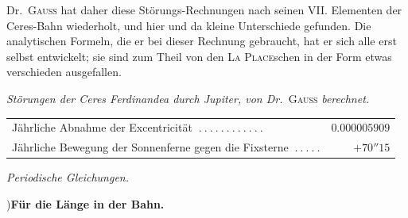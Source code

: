 Dr.\ \textsc{Gauss} hat daher diese Störungs-Rechnungen nach seinen VII. Elementen der Ceres-Bahn wiederholt, und hier und da kleine Unterschiede gefunden. Die analytischen Formeln, die er bei dieser Rechnung gebraucht, hat er sich alle erst selbst entwickelt; sie sind zum Theil von den \textsc{La Place}schen in der Form etwas verschieden ausgefallen.
\begin{center}
\textit{Störungen der Ceres Ferdinandea durch Jupiter, von Dr.\ }\textsc{Gauss}\textit{ berechnet.}\par\medskip
{\small\setlength{\tabcolsep}{3pt}
\begin{tabular}{l r}
Jährliche Abnahme der Excentricität $\ .\ .\ .\ .\ .\ .\ .\ .\ .\ .\ .\ .$&$0.000005909$\\
Jährliche Bewegung der Sonnenferne gegen die Fixsterne $\ .\ .\ .\ .\ .$&$+70''15$
\end{tabular}}
\par\bigskip
\textit{Periodische Gleichungen.}\par{})\quad \textbf{Für die Länge in der Bahn.}
\end{center}
\begin{center}\begingroup\fontsize{10}{12}\selectfont\setlength{\arraycolsep}{5pt}
%
\ifdim\wd0>\linewidth\resizebox{\linewidth}{!}{\usebox{0}}\else\usebox{0}\fi
\endgroup\end{center}
